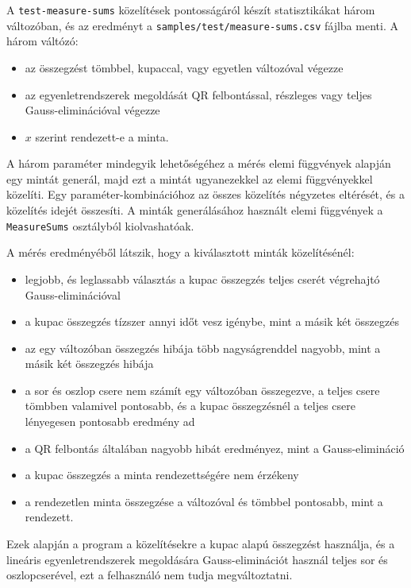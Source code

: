 A \texttt{test-measure-sums} közelítések pontosságáról készít statisztikákat három változóban, és az eredményt a \texttt{samples/test/measure-sums.csv} fájlba menti.
A három váltózó:
\begin{itemize}
\item az összegzést tömbbel, kupaccal, vagy egyetlen változóval végezze
\item az egyenletrendszerek megoldását QR felbontással, részleges vagy teljes Gauss-eliminációval végezze
\item $x$ szerint rendezett-e a minta.
\end{itemize}
A három paraméter mindegyik lehetőségéhez a mérés elemi függvények alapján egy mintát generál, majd ezt a mintát ugyanezekkel az elemi függvényekkel közelíti.
Egy paraméter-kombinációhoz az összes közelítés négyzetes eltérését, és a közelítés idejét összesíti.
A minták generálásához használt elemi függvények a \texttt{MeasureSums} osztályból kiolvashatóak.

A mérés eredményéből látszik, hogy a kiválasztott minták közelítésénél:
\begin{itemize}
\item legjobb, és leglassabb választás a kupac összegzés teljes cserét végrehajtó Gauss-eliminációval
\item a kupac összegzés tízszer annyi időt vesz igénybe, mint a másik két összegzés
\item az egy változóban összegzés hibája több nagyságrenddel nagyobb, mint a másik két összegzés hibája
\item a sor és oszlop csere nem számít egy változóban összegezve, a teljes csere tömbben valamivel pontosabb, és a kupac összegzésnél a teljes csere lényegesen pontosabb eredmény ad
\item a QR felbontás általában nagyobb hibát eredményez, mint a Gauss-elimináció
\item a kupac összegzés a minta rendezettségére nem érzékeny
\item a rendezetlen minta összegzése a változóval és tömbbel pontosabb, mint a rendezett.
\end{itemize}
Ezek alapján a program a közelítésekre a kupac alapú összegzést használja, és a lineáris egyenletrendszerek megoldására Gauss-eliminációt használ teljes sor és oszlopcserével, ezt a felhasználó nem tudja megváltoztatni.

